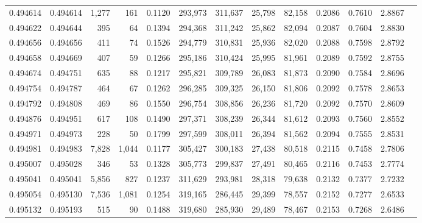 \begin{tabular}{rrrrrrrrrrrrr}
0.494614 & 0.494614 & 1,277 &   161 &                                     0.1120 & 293,973 & 311,637 &  25,798 &  82,158 & 0.2086 & 0.7610 & 2.8867 \\
0.494622 & 0.494644 &   395 &    64 &                                     0.1394 & 294,368 & 311,242 &  25,862 &  82,094 & 0.2087 & 0.7604 & 2.8830 \\
0.494656 & 0.494656 &   411 &    74 &                                     0.1526 & 294,779 & 310,831 &  25,936 &  82,020 & 0.2088 & 0.7598 & 2.8792 \\
0.494658 & 0.494669 &   407 &    59 &                                     0.1266 & 295,186 & 310,424 &  25,995 &  81,961 & 0.2089 & 0.7592 & 2.8755 \\
0.494674 & 0.494751 &   635 &    88 &                                     0.1217 & 295,821 & 309,789 &  26,083 &  81,873 & 0.2090 & 0.7584 & 2.8696 \\
0.494754 & 0.494787 &   464 &    67 &                                     0.1262 & 296,285 & 309,325 &  26,150 &  81,806 & 0.2092 & 0.7578 & 2.8653 \\
0.494792 & 0.494808 &   469 &    86 &                                     0.1550 & 296,754 & 308,856 &  26,236 &  81,720 & 0.2092 & 0.7570 & 2.8609 \\
0.494876 & 0.494951 &   617 &   108 &                                     0.1490 & 297,371 & 308,239 &  26,344 &  81,612 & 0.2093 & 0.7560 & 2.8552 \\
0.494971 & 0.494973 &   228 &    50 &                                     0.1799 & 297,599 & 308,011 &  26,394 &  81,562 & 0.2094 & 0.7555 & 2.8531 \\
0.494981 & 0.494983 & 7,828 & 1,044 &                                     0.1177 & 305,427 & 300,183 &  27,438 &  80,518 & 0.2115 & 0.7458 & 2.7806 \\
0.495007 & 0.495028 &   346 &    53 &                                     0.1328 & 305,773 & 299,837 &  27,491 &  80,465 & 0.2116 & 0.7453 & 2.7774 \\
0.495041 & 0.495041 & 5,856 &   827 &                                     0.1237 & 311,629 & 293,981 &  28,318 &  79,638 & 0.2132 & 0.7377 & 2.7232 \\
0.495054 & 0.495130 & 7,536 & 1,081 &                                     0.1254 & 319,165 & 286,445 &  29,399 &  78,557 & 0.2152 & 0.7277 & 2.6533 \\
0.495132 & 0.495193 &   515 &    90 &                                     0.1488 & 319,680 & 285,930 &  29,489 &  78,467 & 0.2153 & 0.7268 & 2.6486 \\

\end{tabular}
